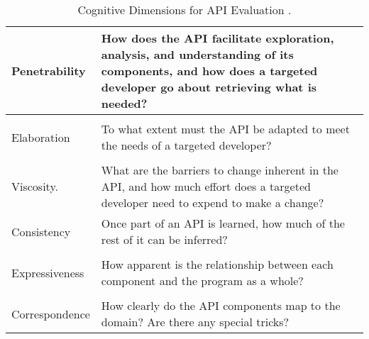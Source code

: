 \begin{table}[]
\begin{tabularx}{\textwidth}{|l|X|}
Penetrability                                                    & How does the API facilitate exploration, analysis, and understanding of its components, and how does a targeted developer go about retrieving what is needed? \\ \hline
\begin{tabular}[c]{@{}l@{}}API\\ Elaboration\end{tabular}        & To what extent must the API be adapted to meet the needs of a targeted developer?                                                                             \\ \hline
\begin{tabular}[c]{@{}l@{}}API\\ Viscosity.\end{tabular}         & What are the barriers to change inherent in the API, and how much effort does a targeted developer need to expend to make a change?                           \\ \hline
Consistency                                                      & Once part of an API is learned, how much of the rest of it can be inferred?                                                                                   \\ \hline
\begin{tabular}[c]{@{}l@{}}Role\\ Expressiveness\end{tabular}    & How apparent is the relationship between each component and the program as a whole?                                                                           \\ \hline
\begin{tabular}[c]{@{}l@{}}Domain\\ Correspondence\end{tabular}  & How clearly do the API components map to the domain? Are there any special tricks?                                                                            \\ \hline
\end{tabularx}
\caption{Cognitive Dimensions for \gls{API} Evaluation \cite{clarke2003using}.}
\label{tab:cogdims}
\end{table}

